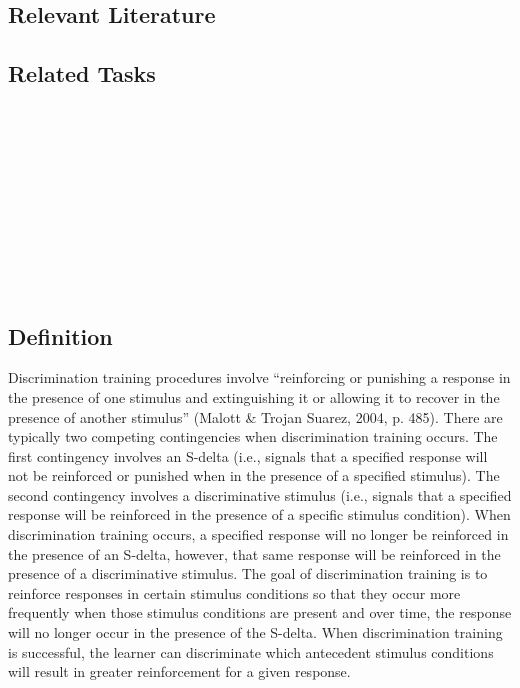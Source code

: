 \subsection{Relevant Literature}
\begin{refsection}
\nocite{cooper2007applied,
        ledford2009single}
\printbibliography[heading=none]
\end{refsection}
%
\subsection{Related Tasks}
\fourbThree{}\\
\fourgEight{}\\
\fourhThree{}\\
\fourjTwo{}\\
\fourjSeven{}\\
\fourjEight{}\\
\fourjTen{}\\
\fourkTwo{}\\
\fourkSeven{}\\
%
\clearpage \section{\foureTwo{}}
\subsection{Definition}
Discrimination training procedures involve ``reinforcing or punishing a response in the presence of one stimulus and extinguishing it or allowing it to recover in the presence of another stimulus'' (Malott \& Trojan Suarez, 2004, p. 485). There are typically two competing contingencies when discrimination training occurs.  The first contingency involves an S-delta (i.e., signals that a specified response will not be reinforced or punished when in the presence of a specified stimulus). The second contingency involves a discriminative stimulus (i.e., signals that a specified response will be reinforced in the presence of a specific stimulus condition). When discrimination training occurs, a specified response will no longer be reinforced in the presence of an S-delta, however, that same response will be reinforced in the presence of a discriminative stimulus. The goal of discrimination training is to reinforce responses in certain stimulus conditions so that they occur more frequently when those stimulus conditions are present and over time, the response will no longer occur in the presence of the S-delta. When discrimination training is successful, the learner can discriminate which antecedent stimulus conditions will result in greater reinforcement for a given response. 
%
